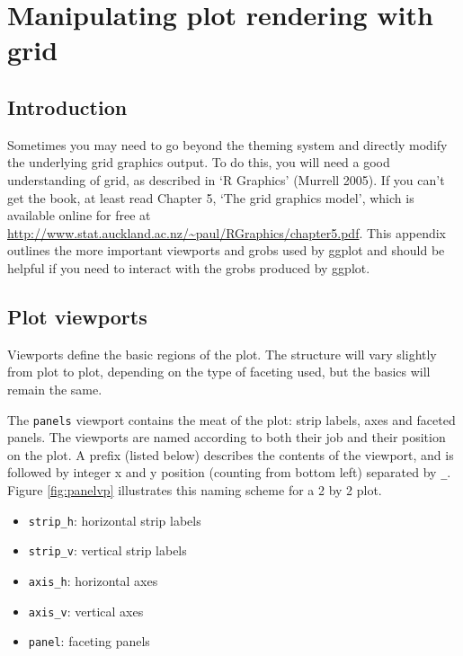 \chapter{Manipulating plot rendering with grid}\label{cha:grid}

\section{Introduction}

Sometimes you may need to go beyond the theming system and directly
modify the underlying grid graphics output. To do this, you will need a
good understanding of grid, as described in `R Graphics' (Murrell 2005).
If you can't get the book, at least read Chapter 5, `The grid graphics
model', which is available online for free at
\url{http://www.stat.auckland.ac.nz/~paul/RGraphics/chapter5.pdf}. This
appendix outlines the more important viewports and grobs used by ggplot
and should be helpful if you need to interact with the grobs produced by
ggplot.  

\section{Plot viewports}\label{sec:plot-viewports}

Viewports define the basic regions of the plot. The structure will vary
slightly from plot to plot, depending on the type of faceting used, but
the basics will remain the same. 

The \texttt{panels} viewport contains the meat of the plot: strip
labels, axes and faceted panels. The viewports are named according to
both their job and their position on the plot. A prefix (listed below)
describes the contents of the viewport, and is followed by integer x and
y position (counting from bottom left) separated by \texttt{\_}. Figure
\ref{fig:panelvp} illustrates this naming scheme for a 2 by 2 plot.

\begin{itemize}
\itemsep1pt\parskip0pt
\item
  \texttt{strip\_h}: horizontal strip labels
\item
  \texttt{strip\_v}: vertical strip labels
\item
  \texttt{axis\_h}: horizontal axes
\item
  \texttt{axis\_v}: vertical axes
\item
  \texttt{panel}: faceting panels
\end{itemize}

